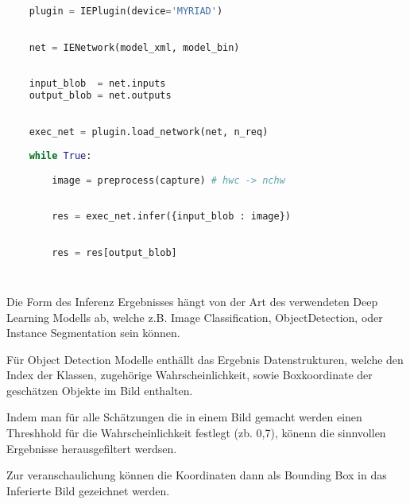 \vspace{1cm}
\begin{minipage}{0.30\textwidth}
    \centering
    
    \label{fig:inger_engine_workflow}
\end{minipage}
\begin{minipage}{0.70\textwidth}

\begin{lstlisting}[language=Python]

    plugin = IEPlugin(device='MYRIAD')

        
    net = IENetwork(model_xml, model_bin)
        
    
    input_blob  = net.inputs
    output_blob = net.outputs
        

    exec_net = plugin.load_network(net, n_req)
        
    while True:

        image = preprocess(capture) # hwc -> nchw
        
        
        res = exec_net.infer({input_blob : image})
        

        res = res[output_blob]
        
        
\end{lstlisting}
\vspace{1.5cm}
\end{minipage}
\vspace{1cm}



Die Form des Inferenz Ergebnisses hängt von der 
Art des verwendeten Deep Learning Modells ab, welche 
z.B. Image Classification, ObjectDetection, oder Instance
Segmentation sein können.

Für Object Detection Modelle enthällt das Ergebnis Datenstrukturen, 
welche den Index der Klassen, zugehörige Wahrscheinlichkeit, 
sowie Boxkoordinate der geschätzen Objekte im Bild enthalten.

Indem man für alle Schätzungen die in einem Bild gemacht werden 
einen Threshhold für die Wahrscheinlichkeit festlegt (zb. 0,7),
könenn die sinnvollen Ergebnisse herausgefiltert werdsen.

Zur veranschaulichung können die Koordinaten dann 
als Bounding Box in das Inferierte Bild gezeichnet werden.
